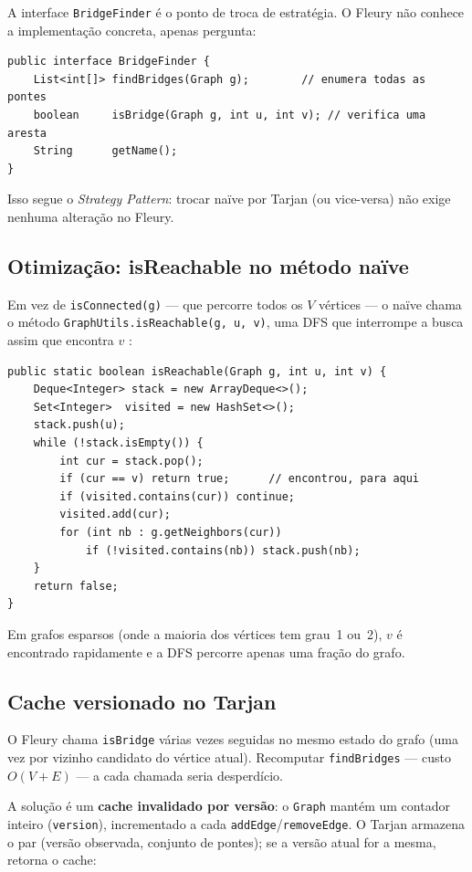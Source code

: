 \documentclass[12pt]{article}
\begin{document}
A interface \texttt{BridgeFinder} é o ponto de troca de estratégia.
O Fleury não conhece a implementação concreta, apenas pergunta:

\begin{lstlisting}
public interface BridgeFinder {
    List<int[]> findBridges(Graph g);        // enumera todas as pontes
    boolean     isBridge(Graph g, int u, int v); // verifica uma aresta
    String      getName();
}
\end{lstlisting}

Isso segue o \textit{Strategy Pattern}: trocar naïve por Tarjan (ou
vice-versa) não exige nenhuma alteração no Fleury.

\subsection{Otimização: isReachable no método naïve}

Em vez de \texttt{isConnected(g)} --- que percorre todos os $V$ vértices
--- o naïve chama o método
\texttt{GraphUtils\allowbreak.isReachable(\allowbreak g,\,u,\,v)},
uma DFS que interrompe a busca assim que encontra $v$ \cite{so-dfs}:

\begin{lstlisting}
public static boolean isReachable(Graph g, int u, int v) {
    Deque<Integer> stack = new ArrayDeque<>();
    Set<Integer>  visited = new HashSet<>();
    stack.push(u);
    while (!stack.isEmpty()) {
        int cur = stack.pop();
        if (cur == v) return true;      // encontrou, para aqui
        if (visited.contains(cur)) continue;
        visited.add(cur);
        for (int nb : g.getNeighbors(cur))
            if (!visited.contains(nb)) stack.push(nb);
    }
    return false;
}
\end{lstlisting}

Em grafos esparsos (onde a maioria dos vértices tem grau~1 ou~2), $v$ é
encontrado rapidamente e a DFS percorre apenas uma fração do grafo.

\subsection{Cache versionado no Tarjan}

O Fleury chama \texttt{isBridge} várias vezes seguidas no mesmo estado do
grafo (uma vez por vizinho candidato do vértice atual). Recomputar
\texttt{findBridges} --- custo $O(V{+}E)$ --- a cada chamada seria
desperdício.

A solução é um \textbf{cache invalidado por versão}: o \texttt{Graph}
mantém um contador inteiro (\texttt{version}), incrementado a cada
\texttt{addEdge}/\texttt{removeEdge}. O Tarjan armazena o par (versão
observada, conjunto de pontes); se a versão atual for a mesma, retorna o
cache:
\end{document}
